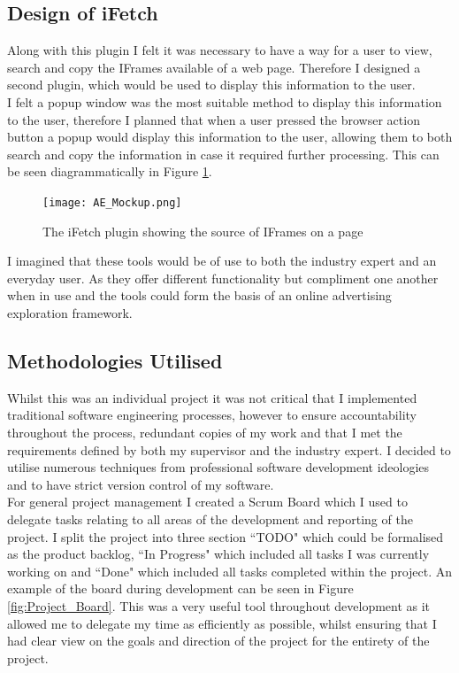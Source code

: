 \documentclass[12pt]{article}
\begin{document}
\subsection{Design of iFetch}
Along with this plugin I felt it was necessary to have a way for a user to view, search and copy the IFrames available of a web page. Therefore I designed a second plugin, which would be used to display this information to the user. \\

I felt a popup window was the most suitable method to display this information to the user, therefore I planned that when a user pressed the browser action button a popup would display this information to the user, allowing them to both search and copy the information in case it required further processing. This can be seen diagrammatically in Figure \ref{fig:AE_Mockup}.

\begin{figure}[H]
    \centering
    \texttt{[image: AE\_Mockup.png]}
    \caption{The iFetch plugin showing the source of IFrames on a page}
    \label{fig:AE_Mockup}
\end{figure}

I imagined that these tools would be of use to both the industry expert and an everyday user. As they offer different functionality but compliment one another when in use and the tools could form the basis of an online advertising exploration framework. 

\subsection{Methodologies Utilised}
Whilst this was an individual project it was not critical that I implemented traditional software engineering processes, however to ensure accountability throughout the process, redundant copies of my work and that I met the requirements defined by both my supervisor and the industry expert. I decided to utilise numerous techniques from professional software development ideologies and to have strict version control of my software. \\

For general project management I created a Scrum Board which I used to delegate tasks relating to all areas of the development and reporting of the project. I split the project into three section ``TODO" which could be formalised as the product backlog, ``In Progress" which included all tasks I was currently working on and ``Done" which included all tasks completed within the project. An example of the board during development can be seen in Figure \ref{fig:Project_Board}. This was a very useful tool throughout development as it allowed me to delegate my time as efficiently as possible, whilst ensuring that I had clear view on the goals and direction of the project for the entirety of the project.
\end{document}
